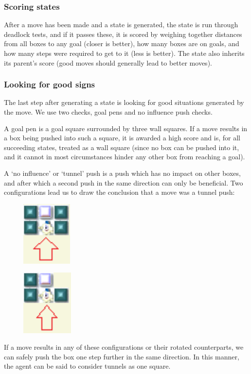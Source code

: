 \documentclass[article,11pt]{article}
\begin{document}
\subsubsection{Scoring states}
After a move has been made and a state is generated, the state is run
through deadlock tests, and if it passes these, it is scored by
weighing together distances from all boxes to any goal (closer is
better), how many boxes are on goals, and how many steps were required
to get to it (less is better). The state also inherits its parent’s
score (good moves should generally lead to better moves).

\subsubsection{Looking for good signs}
The last step after generating a state is looking for good situations
generated by the move.
We use two checks, goal pens and no influence push checks.

A goal pen is a goal square surrounded by three wall squares. If a
move results in a box being pushed into such a square, it is awarded a
high score and is, for all succeeding states, treated as a wall square
(since no box can be pushed into it, and it cannot in most
circumstances hinder any other box from reaching a goal).

A ‘no influence’ or ‘tunnel’ push is a push which has no impact on
other boxes, and after which a second push in the same direction can
only be beneficial. Two configurations lead us to draw the conclusion
that a move was a tunnel push:
\begin{figure}[h]
\includegraphics{good.pdf}
\end{figure}
\begin{figure}[h]
\includegraphics{good2.pdf}
\end{figure}
If a move results in any of these configurations or their rotated
counterparts, we can safely push the box one step further in the same
direction. In this manner, the agent can be said to consider tunnels
as one square.
\end{document}
